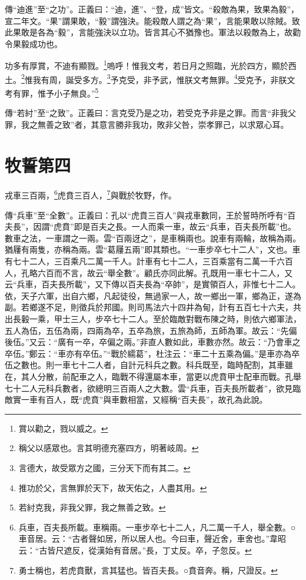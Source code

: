 {\noindent\zhuan{}\fzbyks 傳“迪進”至“之功”。正義曰：“迪，進”、“登，成”皆文。“殺敵為果，致果為毅”，宣二年文。“果”謂果敢，“毅”謂強決。能殺敵人謂之為“果”，言能果敢以除賊。致此果敢是各為“毅”，言能強決以立功。皆言其心不猶豫也。軍法以殺敵為上，故勸令果毅成功也。 \par}

功多有厚賞，不迪有顯戮。\footnote{賞以勸之，戮以威之。}嗚呼！惟我文考，若日月之照臨，光於四方，顯於西土。\footnote{稱父以感眾也。言其明德充塞四方，明著岐周。}惟我有周，誕受多方。\footnote{言德大，故受眾方之國，三分天下而有其二。}予克受，非予武，惟朕文考無罪。\footnote{推功於父，言無罪於天下，故天佑之，人盡其用。}受克予，非朕文考有罪，惟予小子無良。”\footnote{若紂克我，非我父罪，我之無善之致。}

{\noindent\zhuan{}\fzbyks 傳“若紂”至“之致”。正義曰：言克受乃是之功，若受克予非是之罪。而言“非我父罪，我之無善之致”者，其意言勝非我功，敗非父咎，崇孝罪己，以求眾心耳。 \par}

\section{牧誓第四}


戎車三百兩，\footnote{兵車，百夫長所載。車稱兩。一車步卒七十二人，凡二萬一千人，舉全數。○車音居。云：“古者聲如居，所以居人也。今曰車，聲近舍，車舍也。”韋昭云：“古皆尺遮反，從漢始有音居。”長，丁丈反。卒，子忽反。}虎賁三百人，\footnote{勇士稱也，若虎賁獸，言其猛也。皆百夫長。○賁音奔。稱，尺證反。}與戰於牧野，作。

{\noindent\zhuan{}\fzbyks 傳“兵車”至“全數”。正義曰：孔以“虎賁三百人”與戎車數同，王於誓時所呼有“百夫長”，因謂“虎賁”即是百夫之長。一人而乘一車，故云“兵車，百夫長所載”也。數車之法，一車謂之一兩。雲“百兩迓之”，是車稱兩也。說車有兩輪，故稱為兩。猶屨有兩隻，亦稱為兩。雲“葛屨五兩”即其類也。“一車步卒七十二人”，文也。車有七十二人，三百乘凡二萬一千人。計車有七十二人，三百乘當有二萬一千六百人，孔略六百而不言，故云“舉全數”。顧氏亦同此解。孔既用一車七十二人，又云“兵車，百夫長所載”，又下傳以百夫長為“卒帥”，是實領百人，非惟七十二人。依，天子六軍，出自六鄉，凡起徒役，無過家一人，故一鄉出一軍，鄉為正，遂為副。若鄉遂不足，則徵兵於邦國。則司馬法六十四井為甸，計有五百七十六夫，共出長轂一乘，甲士三人，步卒七十二人。至於臨敵對戰布陳之時，則依六鄉軍法，五人為伍，五伍為兩，四兩為卒，五卒為旅，五旅為師，五師為軍。故云：“先偏後伍。”又云：“廣有一卒，卒偏之兩。”非直人數如此，車數亦然。故云：“乃會車之卒伍。”鄭云：“車亦有卒伍。”“戰於繻葛”，杜注云：“車二十五乘為偏。”是車亦為卒伍之數也。則一車七十二人者，自計元科兵之數。科兵既至，臨時配割，其車雖在，其人分散，前配車之人，臨戰不得還屬本車，當更以虎賁甲士配車而戰。孔舉七十二人元科兵數者，欲總明三百兩人之大數。雲“兵車，百夫長所載者”，欲見臨敵實一車有百人，既“虎賁”與車數相當，又經稱“百夫長”，故孔為此說。 \par}

